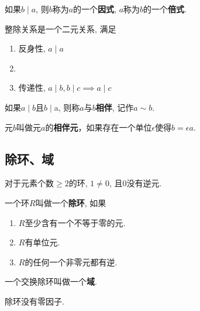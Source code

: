 \begin{Definition}[因式]
如果$b \mid a$, 则$b$称为$a$的一个\textbf{因式}, $a$称为$b$的一个\textbf{倍式}.
\end{Definition}

\begin{Proposition}
整除关系是一个二元关系, 满足
\begin{enumerate}[(1)]
\item 反身性, $a \mid a$ 
\item {}
\item 传递性, $a \mid b, b \mid c \implies a \mid c$
\end{enumerate}
\end{Proposition}

\begin{Definition}[相伴]
如果$a \mid b$且$b \mid $a, 则称$a$与$b$\textbf{相伴}, 记作$a \sim b$. 
\end{Definition}

\begin{Definition}[相伴等价定义]
{元$b$叫做元$a$的\textbf{相伴元}，如果存在一个单位$\epsilon$使得$b = \epsilon a$}.
\end{Definition}

\subsection{除环、域} %

\begin{Proposition}
对于元素个数$\ge 2$的环, $\mathfrak{1} \neq \mathfrak{0}$, 且$\mathfrak{0}$没有逆元.
\end{Proposition}

\begin{Definition}[除环]
一个环$R$叫做一个\textbf{除环}, 如果
\begin{enumerate}
	\item $R$至少含有一个不等于零的元.
	\item $R$有单位元.
	\item $R$的任何一个非零元都有逆.
\end{enumerate}
\end{Definition}

\begin{Definition}[域]
一个交换除环叫做一个\textbf{域}.
\end{Definition}

\begin{Property}
除环没有零因子.
\end{Property}

